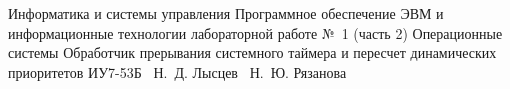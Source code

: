 \documentclass{bmstu}
\begin{document}
\makereporttitle
{Информатика и системы управления} %
{Программное обеспечение ЭВМ и информационные технологии}
{лабораторной работе №~1 (часть 2)} %
{Операционные системы} %
{Обработчик прерывания системного таймера и пересчет динамических приоритетов} %
{} %
{ИУ7-53Б} %
{~Н.~Д. Лысцев} %
{~Н.~Ю. Рязанова}

\maketableofcontents



\end{document}
